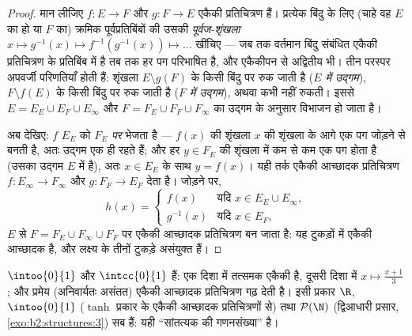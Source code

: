 \begin{proof}
मान लीजिए $f \colon E \to F$ और $g \colon F \to E$ एकैकी प्रतिचित्रण हैं। प्रत्येक बिंदु के लिए
(चाहे वह $E$ का हो या $F$ का) क्रमिक पूर्वप्रतिबिंबों की उसकी
\emph{पूर्वज-शृंखला} $x \mapsto g^{-1}(x) \mapsto
f^{-1}(g^{-1}(x)) \mapsto \dots$ खींचिए --- जब तक वर्तमान बिंदु संबंधित एकैकी
प्रतिचित्रण के प्रतिबिंब में है तब तक हर पग परिभाषित है, और एकैकीपन से
अद्वितीय भी। तीन परस्पर अपवर्जी परिणतियाँ होती हैं: शृंखला $E \setminus g(F)$ के किसी
बिंदु पर रुक जाती है (\emph{$E$ में उद्गम}), $F \setminus f(E)$ के किसी बिंदु पर रुक
जाती है (\emph{$F$ में उद्गम}), अथवा कभी नहीं रुकती। इससे $E = E_E \cup E_F \cup
E_\infty$ और $F = F_E \cup F_F \cup F_\infty$
का उद्गम के अनुसार विभाजन हो जाता है।

अब देखिए: $f$ $E_E$ को $F_E$ \emph{पर} भेजता है --- $f(x)$ की शृंखला $x$ की
शृंखला के आगे एक पग जोड़ने से बनती है, अतः उद्गम एक ही रहते हैं; और हर
$y \in F_E$ की शृंखला में कम से कम एक पग होता है (उसका उद्गम $E$ में है), अतः
$x \in E_E$ के साथ $y = f(x)$। यही तर्क एकैकी आच्छादक प्रतिचित्रण $f \colon E_\infty \to F_\infty$ और $g \colon F_F
\to E_F$ देता
है। जोड़ने पर,
\[
h(x) =
\begin{cases}
f(x) & \text{यदि } x \in E_E \cup E_\infty,\\
g^{-1}(x) & \text{यदि } x \in E_F,
\end{cases}
\]
$E$ से $F = F_E \cup F_\infty \cup F_F$ पर एकैकी आच्छादक प्रतिचित्रण बन जाता है: यह टुकड़ों में
एकैकी आच्छादक है, और लक्ष्य के तीनों टुकड़े असंयुक्त हैं।
\end{proof}

\begin{example}\label{ex:b2:structures:cbexample}
$\intoo{0}{1}$ और $\intcc{0}{1}$  हैं: एक दिशा में तत्समक एकैकी है, दूसरी दिशा में
$x \mapsto \frac{x + 1}{3}$; और प्रमेय (अनिवार्यतः असंतत) एकैकी आच्छादक प्रतिचित्रण गढ़ देती
है। इसी प्रकार $\R$, $\intoo{0}{1}$ ($\tanh$ प्रकार के एकैकी आच्छादक प्रतिचित्रणों से)
तथा $\mathcal{P}(\N)$ (द्विआधारी प्रसार, \cref{exo:b2:structures:3}) सब  हैं: यही ``सांतत्यक की
गणनसंख्या'' है।
\end{example}

